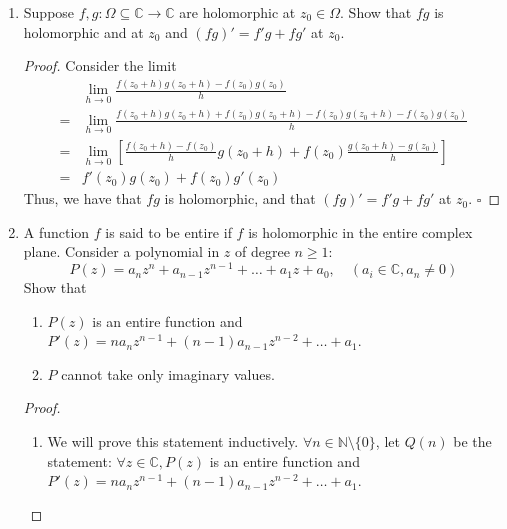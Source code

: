 \documentclass[11pt, oneside]{book}
\theoremstyle{break}
\newtheorem*{proof}{Proof}
\newcommand{\qed}{\hfill\ensuremath{\square}}   %
\begin{document}
\begin{enumerate}
	\pagebreak

	\item Suppose $f, g : \Omega \subseteq \mathbb{C} \to \mathbb{C}$ are holomorphic at $z_0 \in \Omega$. Show that $fg$ is holomorphic and at $z_0$ and $(fg)' = f'g + fg'$ at $z_0$.

	\begin{proof}
		Consider the limit
		\begin{align*}
				&\lim_{h \to 0} \frac{f(z_0 + h)g(z_0 + h) - f(z_0)g(z_0)}{h} \\
			=	&\lim_{h \to 0} \frac{f(z_0 + h)g(z_0 + h) + f(z_0)g(z_0 + h) - f(z_0)g(z_0 + h) - f(z_0)g(z_0)}{h} \\
			=	&\lim_{h \to 0} \left[ \frac{f(z_0 + h) - f(z_0)}{h} g(z_0 + h) + f(z_0) \frac{g(z_0 + h) - g(z_0)}{h} \right] \\
			=	&f'(z_0)g(z_0) + f(z_0)g'(z_0)
		\end{align*}
		Thus, we have that $fg$ is holomorphic, and that $(fg)' = f'g + fg'$ at $z_0$. \qed
	\end{proof}

	\item A function $f$ is said to be entire if $f$ is holomorphic in the entire complex plane. Consider a polynomial in $z$ of degree $n \geq 1$:
	\begin{equation*}
		P(z) = a_n z^n + a_{n - 1} z^{n - 1} + \hdots + a_1 z + a_0, \quad (a_i \in \mathbb{C}, a_n \neq 0)
	\end{equation*}
	Show that
	\begin{enumerate}
		\item $P(z)$ is an entire function and $P'(z) = na_n z^{n - 1} + (n - 1)a_{n - 1} z^{n - 2} + \hdots + a_1$.
		\item $P$ cannot take only imaginary values.
	\end{enumerate}

	\begin{proof}
		\begin{enumerate}
			\item We will prove this statement inductively. $\forall n \in \mathbb{N} \setminus \{0\}$, let $Q(n)$ be the statement: $\forall z \in \mathbb{C}, P(z)$ is an entire function and $P'(z) = na_n z^{n - 1} + (n - 1)a_{n - 1} z^{n - 2} + \hdots + a_1$.


\end{enumerate}
\end{proof}
\end{enumerate}
\end{document}
